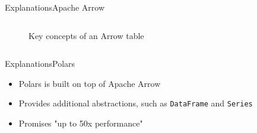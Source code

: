 \begin{frame}[t]{Explanations}{Apache Arrow}
\begin{columns}[t]
\begin{column}{0.6\linewidth}
{\begin{figure}
\begin{tikzpicture}
					\end{tikzpicture}
					\caption{Key concepts of an Arrow table\footnotemark}
				\end{figure}
			}
		\end{column}
		\hfill
	\end{columns}
\end{frame}
\begin{frame}[t]{Explanations}{Polars}
	\begin{itemize}
		\item Polars is built on top of Apache Arrow\footnotemark[1]
		\item Provides additional abstractions, such as \Verb|DataFrame| and \Verb|Series|\footnotemark[1]
		\item Promises "up to 50x performance"\footnotemark[1]
	\end{itemize}
\end{frame}



